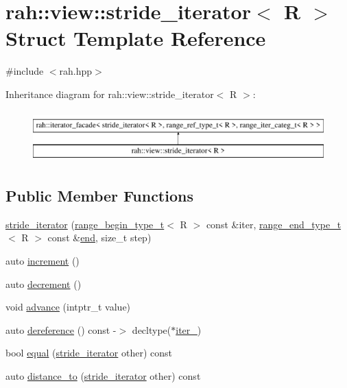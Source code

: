 \hypertarget{structrah_1_1view_1_1stride__iterator}{}\section{rah\+::view\+::stride\+\_\+iterator$<$ R $>$ Struct Template Reference}
\label{structrah_1_1view_1_1stride__iterator}


{\ttfamily \#include $<$rah.\+hpp$>$}

Inheritance diagram for rah\+::view\+::stride\+\_\+iterator$<$ R $>$\+:\begin{figure}[H]
\begin{center}
\leavevmode
\includegraphics[height=2.000000cm]{structrah_1_1view_1_1stride__iterator}
\end{center}
\end{figure}
\subsection*{Public Member Functions}
\begin{DoxyCompactItemize}
\item 
\mbox{\hyperlink{structrah_1_1view_1_1stride__iterator_a47ddd2ce0f295fa825919f04431d64a9}{stride\+\_\+iterator}} (\mbox{\hyperlink{namespacerah_a28aff4eeddcece6be65ff0b956d32d4a}{range\+\_\+begin\+\_\+type\+\_\+t}}$<$ R $>$ const \&iter, \mbox{\hyperlink{namespacerah_a9657e24ae477f4482225b133fe286b65}{range\+\_\+end\+\_\+type\+\_\+t}}$<$ R $>$ const \&\mbox{\hyperlink{namespacerah_aaddd1442cd76b96876e692cdefe7261d}{end}}, size\+\_\+t step)
\item 
auto \mbox{\hyperlink{structrah_1_1view_1_1stride__iterator_ae98465362884b064db4184a406221154}{increment}} ()
\item 
auto \mbox{\hyperlink{structrah_1_1view_1_1stride__iterator_a8104aed5699a5f26626c8a010a97f5f4}{decrement}} ()
\item 
void \mbox{\hyperlink{structrah_1_1view_1_1stride__iterator_aede4ba99f4ede1afdad678bd0dba4f7b}{advance}} (intptr\+\_\+t value)
\item 
auto \mbox{\hyperlink{structrah_1_1view_1_1stride__iterator_a8db124e5f1f4260387c40336712b1566}{dereference}} () const -\/$>$ decltype($\ast$\mbox{\hyperlink{structrah_1_1view_1_1stride__iterator_a65e7fa92e8026ce48e3c132e808e9ffc}{iter\+\_\+}})
\item 
bool \mbox{\hyperlink{structrah_1_1view_1_1stride__iterator_a34c24e935ee7beebcd7269ee314e245a}{equal}} (\mbox{\hyperlink{structrah_1_1view_1_1stride__iterator}{stride\+\_\+iterator}} other) const
\item 
auto \mbox{\hyperlink{structrah_1_1view_1_1stride__iterator_ad30be3983aec3fab52efb32a1a461056}{distance\+\_\+to}} (\mbox{\hyperlink{structrah_1_1view_1_1stride__iterator}{stride\+\_\+iterator}} other) const
\end{DoxyCompactItemize}
